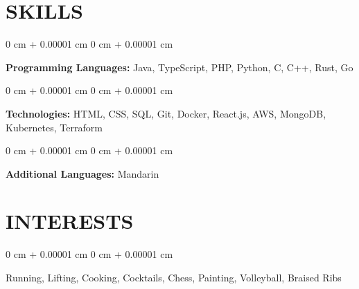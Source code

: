 \documentclass[10pt, letterpaper]{article}
\newenvironment{onecolentry}{
    \begin{adjustwidth}{
        0 cm + 0.00001 cm
    }{
        0 cm + 0.00001 cm
    }
}{
    \end{adjustwidth}
} %
\begin{document}
    
    

    \section{SKILLS}

    
    \begin{onecolentry}
        \textbf{Programming Languages:} Java, TypeScript, PHP, Python, C, C++, Rust, Go
    \end{onecolentry}

    \begin{onecolentry}
        \textbf{Technologies:} HTML, CSS, SQL, Git, Docker, React.js, AWS, MongoDB, Kubernetes, Terraform
    \end{onecolentry}
    
    \begin{onecolentry}
    	\textbf{Additional Languages:} Mandarin
    \end{onecolentry}


    


	\section{INTERESTS}
	
	
	\begin{onecolentry}
		Running, Lifting, Cooking, Cocktails, Chess, Painting, Volleyball, Braised Ribs
	\end{onecolentry}
\end{document}
